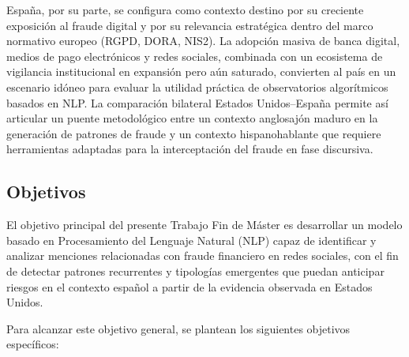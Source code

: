 España, por su parte, se configura como contexto destino por su creciente exposición al fraude digital y por su relevancia estratégica dentro del marco normativo europeo (RGPD, DORA, NIS2). La adopción masiva de banca digital, medios de pago electrónicos y redes sociales, combinada con un ecosistema de vigilancia institucional en expansión pero aún saturado, convierten al país en un escenario idóneo para evaluar la utilidad práctica de observatorios algorítmicos basados en NLP. La comparación bilateral Estados Unidos--España permite así articular un puente metodológico entre un contexto anglosajón maduro en la generación de patrones de fraude y un contexto hispanohablante que requiere herramientas adaptadas para la interceptación del fraude en fase discursiva.

\subsection{Objetivos}

El objetivo principal del presente Trabajo Fin de Máster es desarrollar un modelo basado en Procesamiento del Lenguaje Natural (NLP) capaz de identificar y analizar menciones relacionadas con fraude financiero en redes sociales, con el fin de detectar patrones recurrentes y tipologías emergentes que puedan anticipar riesgos en el contexto español a partir de la evidencia observada en Estados Unidos.

Para alcanzar este objetivo general, se plantean los siguientes objetivos específicos:

